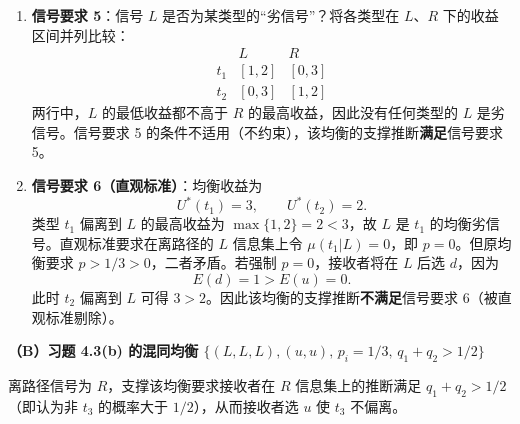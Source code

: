 \begin{enumerate}[leftmargin=1.6em]
  \item \textbf{信号要求 5}：信号 $L$ 是否为某类型的“劣信号”？将各类型在 $L$、$R$ 下的收益区间并列比较：
    \[
      \begin{array}{c|cc}
        & L & R\\ \hline
        t_1 & [1,2] & [0,3]\\
        t_2 & [0,3] & [1,2]
      \end{array}
    \]
    \indent 两行中，$L$ 的最低收益都不高于 $R$ 的最高收益，因此没有任何类型的 $L$ 是劣信号。信号要求 5 的条件不适用（不约束），该均衡的支撑推断\textbf{满足}信号要求 5。
  \item \textbf{信号要求 6（直观标准）}：均衡收益为
    \[
      U^*(t_1)=3,\qquad U^*(t_2)=2.
    \]
    \indent 类型 $t_1$ 偏离到 $L$ 的最高收益为 $\max\{1,2\}=2<3$，故 $L$ 是 $t_1$ 的均衡劣信号。直观标准要求在离路径的 $L$ 信息集上令 $\mu(t_1|L)=0$，即 $p=0$。但原均衡要求 $p>1/3>0$，二者矛盾。若强制 $p=0$，接收者将在 $L$ 后选 $d$，因为
    \[
      E(d)=1>E(u)=0.
    \]
    \indent 此时 $t_2$ 偏离到 $L$ 可得 $3>2$。因此该均衡的支撑推断\textbf{不满足}信号要求 6（被直观标准剔除）。
\end{enumerate}

\noindent\textbf{（B）习题 4.3(b) 的混同均衡 $\{(L,L,L),(u,u),\,p_i=1/3,\,q_1+q_2>1/2\}$}

离路径信号为 $R$，支撑该均衡要求接收者在 $R$ 信息集上的推断满足 $q_1+q_2>1/2$（即认为非 $t_3$ 的概率大于 $1/2$），从而接收者选 $u$ 使 $t_3$ 不偏离。

